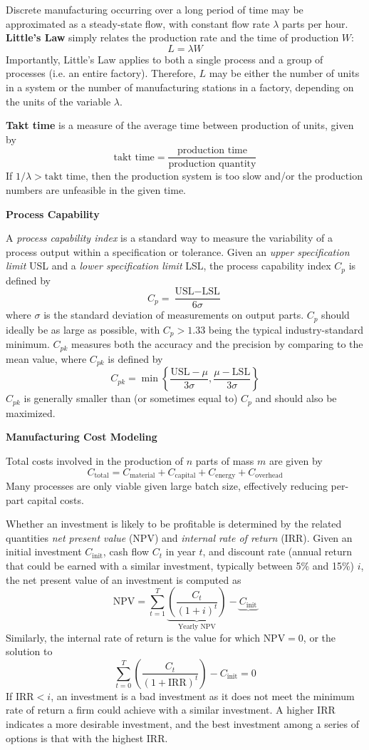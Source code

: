 Discrete manufacturing occurring over a long period of time may be approximated as a steady-state flow, with constant flow rate $\lambda$ parts per hour. \textbf{Little's Law} simply relates the production rate and the time of production $W$: \[L = \lambda W\] Importantly, Little's Law applies to both a single process and a group of processes (i.e. an entire factory). Therefore, $L$ may be either the number of units in a system or the number of manufacturing stations in a factory, depending on the units of the variable $\lambda$.

\textbf{Takt time} is a measure of the average time between production of units, given by \[\text{takt time} = \frac{\text{production time}}{\text{production quantity}}\] If $1/\lambda > \text{takt time}$, then the production system is too slow and/or the production numbers are unfeasible in the given time.

\textbf{Process Capability}

A \textit{process capability index} is a standard way to measure the variability of a process output within a specification or tolerance. Given an \textit{upper specification limit} USL and a \textit{lower specification limit} LSL, the process capability index $C_p$ is defined by \[C_p = \frac{\text{USL}-\text{LSL}}{6\sigma}\] where $\sigma$ is the standard deviation of measurements on output parts. $C_p$ should ideally be as large as possible, with $C_p>1.33$ being the typical industry-standard minimum. $C_{pk}$ measures both the accuracy and the precision by comparing to the mean value, where $C_{pk}$ is defined by \[C_{pk} = \min \left\{\frac{\text{USL}-\mu}{3\sigma},\frac{\mu-\text{LSL}}{3\sigma}\right\}\] $C_{pk}$ is generally smaller than (or sometimes equal to) $C_p$ and should also be maximized.

\textbf{Manufacturing Cost Modeling}

Total costs involved in the production of $n$ parts of mass $m$ are given by \[C_\text{total} = C_\text{material} + C_\text{capital} + C_\text{energy} + C_\text{overhead}\] Many processes are only viable given large batch size, effectively reducing per-part capital costs.

Whether an investment is likely to be profitable is determined by the related quantities \textit{net present value} (NPV) and \textit{internal rate of return} (IRR). Given an initial investment $C_\text{init}$, cash flow $C_t$ in year $t$, and discount rate (annual return that could be earned with a similar investment, typically between 5\% and 15\%) $i$, the net present value of an investment is computed as \[\text{NPV} = \sum_{t=1}^T\underbrace{\left(\frac{C_t}{(1+i)^t}\right)}_\text{Yearly NPV} - \underbrace{C_\text{init}}\] Similarly, the internal rate of return is the value for which $\text{NPV}=0$, or the solution to \[\sum_{t=0}^T \left(\frac{C_t}{(1+\text{IRR})^t}\right) - C_\text{init} = 0\] If $\text{IRR}<i$, an investment is a bad investment as it does not meet the minimum rate of return a firm could achieve with a similar investment. A higher IRR indicates a more desirable investment, and the best investment among a series of options is that with the highest IRR.

